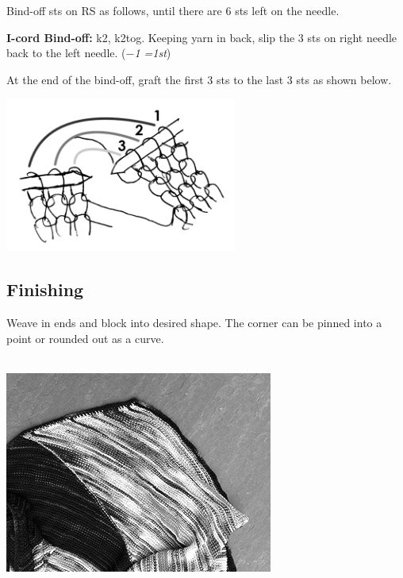 \documentclass[12pt]{article}
\newcommand{\rowDir}[1]{\textbf{#1:}} %
\newcommand{\decrease}[1]{(\emph{$-$#1
	\ifnum#1=1{st}\else{sts}\fi})}
\begin{document}
\begin{multicols}{2}
Bind-off sts on RS as follows, until there are 6 sts left on the needle.

\begin{framed}
\rowDir{I-cord Bind-off} k2, k2tog. Keeping yarn in back, slip the 3 sts on right needle back to the left needle. \decrease{1}
\end{framed}

At the end of the bind-off, graft the first 3 sts to the last 3 sts as shown below.

\vspace{-1em}
\begin{center}
\includegraphics[height=2in]{pics_BW/kitchener.png}
\end{center}

\newpage

\subsection*{Finishing}

Weave in ends and block into desired shape. The corner can be pinned into a point or rounded out as a curve.

~\\
\includegraphics[width=\linewidth]{pics_BW/_middlepoint}


\end{multicols}
\end{document}
